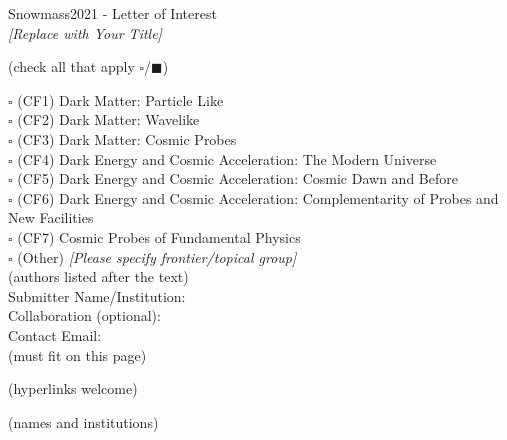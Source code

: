 \documentclass[11pt]{article}
\begin{document}
\begin{raggedright} 
\huge
Snowmass2021 - Letter of Interest \hfill \\[+1em]
\textit{[Replace with Your Title]} \hfill \\[+1em]
\end{raggedright}

\normalsize

  (check all that apply $\square$/$\blacksquare$)

\noindent $\square$ (CF1) Dark Matter: Particle Like \\
\noindent $\square$ (CF2) Dark Matter: Wavelike  \\ 
\noindent $\square$ (CF3) Dark Matter: Cosmic Probes  \\
\noindent $\square$ (CF4) Dark Energy and Cosmic Acceleration: The Modern Universe \\
\noindent $\square$ (CF5) Dark Energy and Cosmic Acceleration: Cosmic Dawn and Before \\
\noindent $\square$ (CF6) Dark Energy and Cosmic Acceleration: Complementarity of Probes and New Facilities \\
\noindent $\square$ (CF7) Cosmic Probes of Fundamental Physics \\
\noindent $\square$ (Other) {\it [Please specify frontier/topical group]} \\

 (authors listed after the text)\\
Submitter Name/Institution: \\
Collaboration (optional): \\
Contact Email: \\

 (must fit on this page)

\clearpage


\clearpage

 (hyperlinks welcome)

\vspace{4in}

 (names and institutions)
\end{document}
